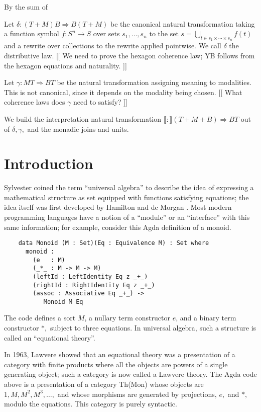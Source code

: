 \documentclass{llncs}
\newcommand{\interp}[1]{\llbracket #1 \rrbracket}
\renewcommand{\:}{\colon}
\begin{document}
By the sum of 

Let $\delta\: (T+M)B \Rightarrow B(T+M)$ be the canonical natural transformation taking a function symbol $f:S^n \to S$ over sets $s_1, \ldots, s_n$ to the set $s = \bigcup_{t \in s_1 \times \cdots \times s_n} f(t)$ and a rewrite over collections to the rewrite applied pointwise.  We call $\delta$ the distributive law. [[ We need to prove the hexagon coherence law; YB follows from the hexagon equations and naturality. ]]

Let $\gamma\: MT \Rightarrow BT$ be the natural transformation assigning meaning to modalities.  This is not canonical, since it depends on the modality being chosen.  [[ What coherence laws does $\gamma$ need to satisfy? ]]

We build the interpretation natural transformation $\interp\: (T+M+B)\Rightarrow BT$ out of $\delta, \gamma,$ and the monadic joins and units.  




\section{Introduction}
  
  Sylvester coined the term ``universal algebra'' to describe the idea of expressing a mathematical structure as set equipped with functions satisfying equations; the idea itself was first developed by Hamilton and de Morgan \cite{Graetzer}.  Most modern programming languages have a notion of a ``module'' or an ``interface'' with this same information; for example, consider this Agda definition of a monoid.
  \begin{verbatim}
    data Monoid (M : Set)(Eq : Equivalence M) : Set where
      monoid :
        (e   : M)
        (_*_ : M -> M -> M)
        (leftId : LeftIdentity Eq z _+_)
        (rightId : RightIdentity Eq z _+_)
        (assoc : Associative Eq _+_) ->
           Monoid M Eq
  \end{verbatim}
  The code defines a sort $M$, a nullary term constructor $e$, and a
  binary term constructor $*,$ subject to three equations. In
  universal algebra, such a structure is called an ``equational
  theory''.
  
  In 1963, Lawvere \cite{Lawvere} showed that an equational theory was
  a presentation of a category with finite products where all the
  objects are powers of a single generating object; such a category is
  now called a Lawvere theory.  The Agda code above is a presentation
  of a category Th(Mon) whose objects are $1, M, M^2, M^3, \ldots,$
  and whose morphisms are generated by projections, $e,$ and $*,$
  modulo the equations.  This category is purely syntactic.
\end{document}
